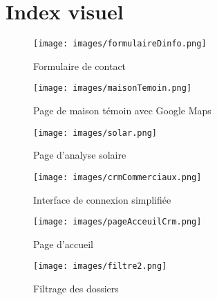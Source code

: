 \section*{Index visuel}

\begin{figure}[H]
    \begin{minipage}[t]{0.6\textwidth}
        \centering
        \texttt{[image: images/formulaireDinfo.png]}
    \end{minipage}
    \begin{minipage}[t]{0.6\textwidth}
        \caption*{Formulaire de contact}
    \end{minipage}
    \vspace{1em}
    \begin{minipage}[t]{0.6\textwidth}
        \centering
        \texttt{[image: images/maisonTemoin.png]}
    \end{minipage}
    \begin{minipage}[t]{0.6\textwidth}
        \caption*{Page de maison témoin avec Google Maps}
    \end{minipage}
    \vspace{1em}
    \begin{minipage}[t]{0.6\textwidth}
        \centering
        \texttt{[image: images/solar.png]}
    \end{minipage}
    \begin{minipage}[t]{0.6\textwidth}
        \caption*{Page d’analyse solaire}
    \end{minipage}
\end{figure}
\newpage

\begin{figure}[H]
    \begin{minipage}[t]{0.6\textwidth}
        \centering
        \texttt{[image: images/crmCommerciaux.png]}
    \end{minipage}
    \begin{minipage}[t]{0.6\textwidth}
        \caption*{Interface de connexion simplifiée}
    \end{minipage}
    \vspace{1em}
    \begin{minipage}[t]{0.6\textwidth}
        \centering
        \texttt{[image: images/pageAcceuilCrm.png]}
    \end{minipage}
    \begin{minipage}[t]{0.6\textwidth}
        \caption*{Page d'accueil}
    \end{minipage}
    \vspace{1em}
    \begin{minipage}[t]{0.6\textwidth}
        \centering
        \texttt{[image: images/filtre2.png]}
    \end{minipage}
    \begin{minipage}[t]{0.6\textwidth}
        \caption*{Filtrage des dossiers}
    \end{minipage}
\end{figure}
\newpage

